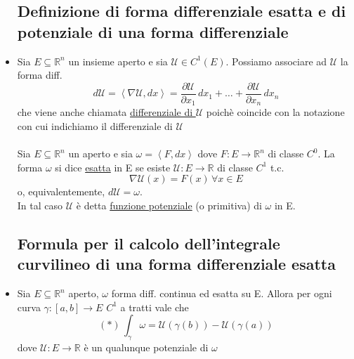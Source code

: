 \documentclass{report}
\newcommand{\ace}{\`e }
\newcommand{\Ins}[1]{\mathbb{#1}}
\newcommand{\R}{\Ins{R}}
\newcommand{\tuple}[1]{\left\langle #1 \right\rangle}
\newcommand{\p}{\partial}
\newcommand{\g}{\gamma}
\newcommand{\om}{\omega}
\newcommand{\U}{\mathcal{U}}
\begin{document}
\begin{itemize}
  \subsection{Definizione di forma differenziale esatta e di potenziale di una forma differenziale}
  \item Sia $E\subseteq\R^n$ un insieme aperto e sia $\U \in C^1(E)$. Possiamo associare ad $\U$
        la forma diff. 
        $$d\U = \tuple{\nabla\U,dx} = \frac{\p \U}{\p x_1}\,dx_1+\dots+\frac{\p \U}{\p x_n}\,dx_n$$
        che viene anche chiamata \underline{differenziale di $\U$} poich\ace coincide con la notazione
        con cui indichiamo il differenziale di $\U$\\\\
        Sia $E\subseteq\R^n$ un aperto e sia $\om = \tuple{F,dx}$ dove
        $F:E\to\R^n$ di classe $C^0$. La forma $\om$ si dice \underline{esatta} in E 
        se esiste $\U:E\to\R$ di classe $C^1$ t.c.
        $$\nabla\U(x) = F(x) \, \forall x \in E$$
        o, equivalentemente, $d\U = \om$.\\
        In tal caso $\U$ \ace detta \underline{funzione potenziale} (o primitiva) di $\om$ in E.

  \subsection{Formula per il calcolo dell’integrale curvilineo di una forma differenziale esatta}
  \item Sia $E \subseteq \R^n$ aperto, $\om$ forma diff. continua ed esatta su E. Allora per ogni
        curva $\g:[a,b]\to E$ $C^1$ a tratti vale che 
        $$(*)\, \int_{\g}\om = \U(\g(b))-\U(\g(a))$$
        dove $\U:E\to\R$ \ace un qualunque potenziale di $\om$


\end{itemize}
\end{document}
